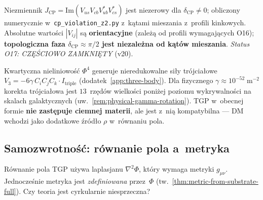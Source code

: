 \begin{remark}\label{rem:jarlskog}
Niezmiennik $J_{\mathrm{CP}} = \mathrm{Im}(V_{us}V_{cb}V_{ub}^*V_{cs}^*)$
jest niezerowy dla $\delta_{\mathrm{CP}} \neq 0$; obliczony
numerycznie w~\texttt{cp\_violation\_z2.py}
z~k\k{a}tami mieszania z~profili kinkowych.
Absolutne warto\'sci $|V_{ij}|$ s\k{a} \textbf{orientacyjne}
(zale\.z\k{a} od profili wymagaj\k{a}cych O16);
\textbf{topologiczna faza $\delta_{\mathrm{CP}} \approx \pi/2$
jest niezale\.zna od k\k{a}t\'ow mieszania}.
\emph{Status O17: CZ\k{E}\'SCIOWO ZAMKNI\k{E}TY} (v20).
\end{remark}

\begin{remark}%
\label{rem:3body-DM}
Kwartyczna nieliniowo\'s\'c $\Phi^4$ generuje nieredukowalne
si\l{}y tr\'ojcia\l{}owe $V_3 = -6\gamma\,C_i C_j C_k \cdot
I_{\mathrm{triple}}$ (dodatek~\ref{app:three-body}).
Dla fizycznego $\gamma \approx 10^{-52}\;\mathrm{m}^{-2}$
korekta tr\'ojcia\l{}owa jest $13$~rz\k{e}d\'ow wielko\'sci
poni\.zej poziomu wykrywalno\'sci na skalach galaktycznych
(uw.~\ref{rem:physical-gamma-rotation}).
TGP w~obecnej formie \textbf{nie zast\k{e}puje ciemnej materii},
ale jest z~ni\k{a} kompatybilna --- DM wchodzi jako dodatkowe
\'zr\'od\l{}o $\rho$ w~r\'ownaniu pola.
\end{remark}

\subsection{Samozwrotno\'s\'c: r\'ownanie pola a~metryka}%
\label{ssec:circularity}

\begin{problem}%
\label{prob:circularity}
R\'ownanie pola TGP u\.zywa laplasjanu $\nabla^2\Phi$, kt\'ory
wymaga metryki $g_{\mu\nu}$. Jednocze\'snie metryka jest
\emph{zdefiniowana} przez~$\Phi$
(tw.~\ref{thm:metric-from-substrate-full}).
Czy teoria jest cyrkularnie niesprzeczna?
\end{problem}

